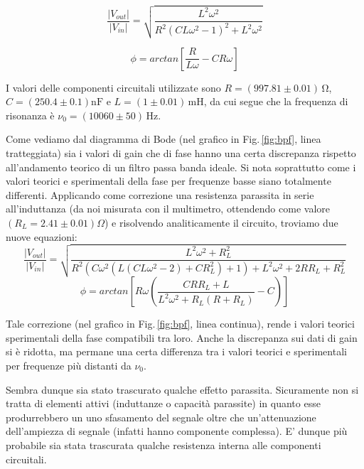 \begin{equation}
\frac{|V_{out}|}{|V_{in}|}=\sqrt{\frac{L^2 \omega ^2}{R^2 \left(C L \omega ^2-1\right)^2+L^2 \omega ^2}}
\label{eq:bpfGain}
\end{equation}

\begin{equation}
\phi=arctan\left[\frac{R}{L \omega}-C R \omega \right]
\label{eq:bpfPhi}
\end{equation}

\noindent I valori delle componenti circuitali utilizzate sono $R=(997.81 \pm 0.01)\,\si{\ohm}$, $C=(250.4 \pm 0.1)\si{\nano\farad}$ e $L=(1 \pm 0.01)\,\si{\milli\henry}$, da cui segue che la frequenza di risonanza è $\nu_0 = (10060 \pm 50)\,\si{\hertz}$.

Come vediamo dal diagramma di Bode (nel grafico in Fig.$\,$\ref{fig:bpf}, linea tratteggiata) sia i valori di gain che di fase hanno una certa discrepanza rispetto all'andamento teorico di un filtro passa banda ideale. Si nota soprattutto come i valori teorici e sperimentali della fase per frequenze basse siano totalmente differenti.
Applicando come correzione una resistenza parassita in serie all'induttanza (da noi misurata con il multimetro, ottendendo come valore $(R_L=2.41\pm 0.01) \Omega$) e risolvendo analiticamente il circuito, troviamo due nuove equazioni:\\

\noindent
\begin{equation}
\frac{|V_{out}|}{|V_{in}|}=\sqrt{\frac{L^2 \omega ^2+R_L^2}{R^2 \left(C \omega ^2 \left(L \left(C L \omega ^2-2\right)+C R_L^2\right)+1\right)+L^2 \omega ^2+2 R R_L+R_L^2}}
\label{bpfGain_corr}
\end{equation}
\begin{equation}
\phi=arctan\left[R \omega \left(\frac{C R R_L+L}{L^2 \omega ^2+R_L (R+R_L)}-C\right)\right]
\label{bpfPhi_corr}
\end{equation}
\break

\noindent Tale correzione (nel grafico in Fig.$\,$\ref{fig:bpf}, linea continua), rende i valori teorici sperimentali della fase compatibili tra loro. Anche la discrepanza sui dati di gain si è ridotta, ma permane una certa differenza tra i valori teorici e sperimentali per frequenze più distanti da $\nu_0$.

Sembra dunque sia stato trascurato qualche effetto parassita. Sicuramente non si tratta di elementi attivi (induttanze o capacità parassite) in quanto esse produrrebbero un uno sfasamento del segnale oltre che un'attenuazione dell'ampiezza di segnale (infatti hanno componente complessa). E' dunque più probabile sia stata trascurata qualche resistenza interna alle componenti circuitali.